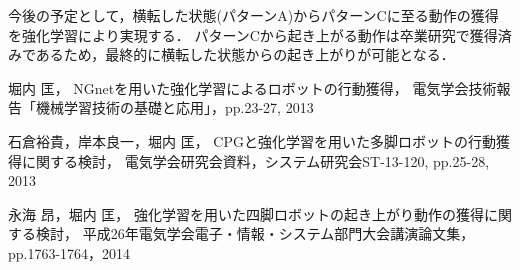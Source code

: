 \documentclass{jarticle}
\begin{document}
今後の予定として，横転した状態(パターンA)からパターンCに至る動作の獲得を強化学習により実現する．
パターンCから起き上がる動作は卒業研究で獲得済みであるため，最終的に横転した状態からの起き上がりが可能となる．

\begin{thebibliography}{99}

堀内 匡，
NGnetを用いた強化学習によるロボットの行動獲得，
電気学会技術報告「機械学習技術の基礎と応用」，pp.23-27, 2013

石倉裕貴，岸本良一，堀内 匡，
CPGと強化学習を用いた多脚ロボットの行動獲得に関する検討，
電気学会研究会資料，システム研究会ST-13-120, pp.25-28, 2013

永海 昂，堀内 匡，
強化学習を用いた四脚ロボットの起き上がり動作の獲得に関する検討，
平成26年電気学会電子・情報・システム部門大会講演論文集，pp.1763-1764，2014

\end{thebibliography}
\end{document}
